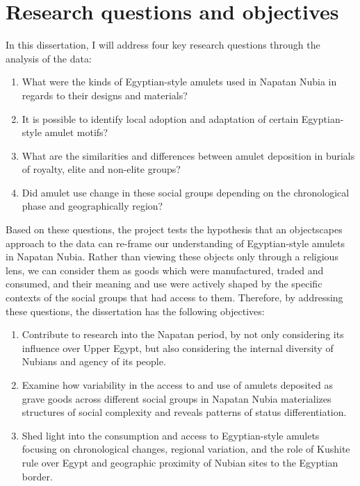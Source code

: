 \section{Research questions and objectives}


In this dissertation, I will address four key research questions through the analysis of the data:


\begin{enumerate}
	\item What were the kinds of Egyptian-style amulets used in Napatan Nubia in regards to their designs and materials?
	\item It is possible to identify local adoption and adaptation of certain Egyptian-style amulet motifs?
	\item What are the similarities and differences between amulet deposition in burials of royalty, elite and non-elite groups?
	\item Did amulet use change in these social groups depending on the chronological phase and geographically region?
\end{enumerate}


Based on these questions, the project tests the hypothesis that an objectscapes approach to the data can re-frame our understanding of Egyptian-style amulets in Napatan Nubia. Rather than viewing these objects only through a religious lens, we can consider them as goods which were manufactured, traded and consumed, and their meaning and use were actively shaped by the specific contexts of the social groups that had access to them. Therefore, by addressing these questions, the dissertation has the following objectives:


\begin{enumerate}
	\item Contribute to research into the Napatan period, by not only considering its influence over Upper Egypt, but also considering the internal diversity of Nubians and agency of its people.
	\item Examine how variability in the access to and use of amulets deposited as grave goods across different social groups in Napatan Nubia materializes structures of social complexity and reveals patterns of status differentiation.
	\item Shed light into the consumption and access to Egyptian-style amulets focusing on chronological changes, regional variation, and the role of Kushite rule over Egypt and geographic proximity of Nubian sites to the Egyptian border.
\end{enumerate}


